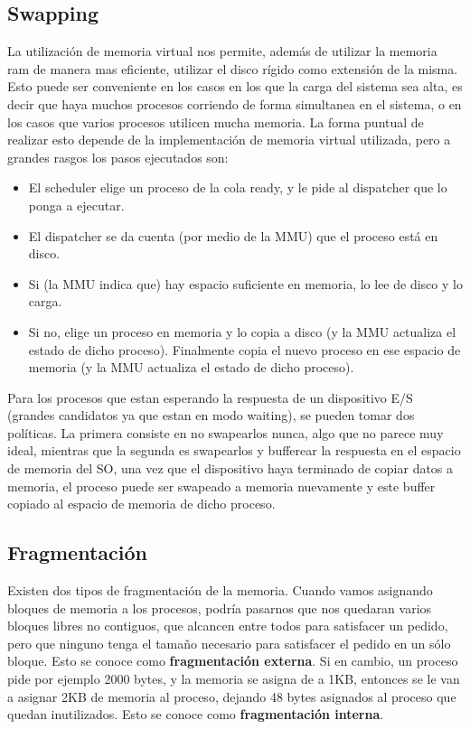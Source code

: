 \documentclass{article}
\begin{document}
\subsection{Swapping}

La utilización de memoria virtual nos permite, además de utilizar la memoria ram de manera mas eficiente, utilizar el disco rígido como extensión de la misma. Esto puede ser conveniente en los casos en los que la carga del sistema sea alta, es decir que haya muchos procesos corriendo de forma simultanea en el sistema, o en los casos que varios procesos utilicen mucha memoria. La forma puntual de realizar esto depende de la implementación de memoria virtual utilizada, pero a grandes rasgos los pasos ejecutados son:

\begin{itemize}
 \item El scheduler elige un proceso de la cola ready, y le pide al dispatcher que lo ponga a ejecutar.
 \item El dispatcher se da cuenta (por medio de la MMU) que el proceso está en disco.
 \item Si (la MMU indica que) hay espacio suficiente en memoria, lo lee de disco y lo carga.
 \item Si no, elige un proceso en memoria y lo copia a disco (y la MMU actualiza el estado de dicho proceso). Finalmente copia el nuevo proceso en ese espacio de memoria (y la MMU actualiza el estado de dicho proceso).
\end{itemize}

Para los procesos que estan esperando la respuesta de un dispositivo E/S (grandes candidatos ya que estan en modo waiting), se pueden tomar dos políticas. La primera consiste en no swapearlos nunca, algo que no parece muy ideal, mientras que la segunda es swapearlos y bufferear la respuesta en el espacio de memoria del SO, una vez que el dispositivo haya terminado de copiar datos a memoria, el proceso puede ser swapeado a memoria nuevamente y este buffer copiado al espacio de memoria de dicho proceso.

\subsection{Fragmentaci\'on}

Existen dos tipos de fragmentaci\'on de la memoria. Cuando vamos asignando bloques de memoria a los procesos, podr\'ia pasarnos que nos quedaran varios bloques libres no contiguos, que alcancen entre todos para satisfacer un pedido, pero que ninguno tenga el tama\~no necesario para satisfacer el pedido en un s\'olo bloque. Esto se conoce como \textbf{fragmentaci\'on externa}. Si en cambio, un proceso pide por ejemplo 2000 bytes, y la memoria se asigna de a 1KB, entonces se le van a asignar 2KB de memoria al proceso, dejando 48 bytes asignados al proceso que quedan inutilizados. Esto se conoce como \textbf{fragmentaci\'on interna}.
\end{document}
